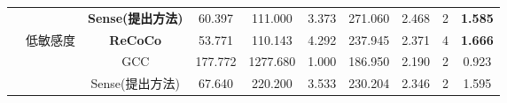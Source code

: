 \begin{table*}[!ht]
{\begin{tabular}{@{}cccccccccc@{}}
                                                                                                      &                            & \textbf{Sense(提出方法)} & 60.397          & 111.000             & 3.373             & 271.060                & 2.468    & 2            & \textbf{1.585} \\ \cmidrule(l){2-10} 
                                                                                                      & \multirow{3}{*}{低敏感度}       & \textbf{ReCoCo}      & 53.771          & 110.143             & 4.292             & 237.945                & 2.371    & 4            & \textbf{1.666}          \\
                                                                                                      &                            & GCC                  & 177.772         & 1277.680            & 1.000             & 186.950                & 2.190    & 2            & 0.923          \\
                                                                                                      &                            & Sense(提出方法)          & 67.640          & 220.200             & 3.533             & 230.204                & 2.346    & 2            & 1.595          \\ \bottomrule
\end{tabular}
}
    \label{tab:exp_results}
\end{table*}